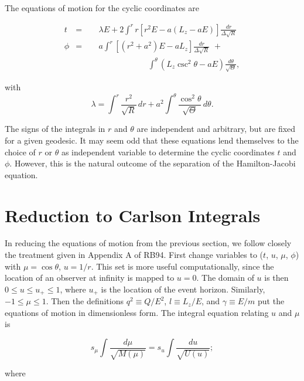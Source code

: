 \documentclass[apj]{emulateapj}
\begin{document}
The equations of motion for the cyclic coordinates are

\begin{eqnarray}
t &=& \lambda E + 2 \int^r r[r^2E-a(L_z - aE)]\frac{dr}{\Delta \sqrt{R}} \\
\nonumber \phi &=& a \int^r[(r^2+a^2)E-aL_z]\frac{dr}{\Delta \sqrt{R}}\hspace{4pt} +\\  &\qquad&\qquad\qquad\qquad\int^\theta (L_z \csc^2 \theta - aE)\frac{d\theta}{\sqrt{\Theta}},
\end{eqnarray}

\noindent with
\begin{equation}\label{leqnr}
\lambda = \int^r \frac{r^2}{\sqrt{R}}\hspace{2pt} dr + a^2 \int^\theta \frac{\cos^2{\theta}}{\sqrt{\Theta}}\hspace{2pt} d\theta.
\end{equation}

The signs of the integrals in $r$ and $\theta$ are independent and arbitrary, but are fixed for a given geodesic. It may seem odd that these equations lend themselves to the choice of $r$ or $\theta$ as independent variable to determine the cyclic coordinates $t$ and $\phi$. However, this is the natural outcome of the separation of the Hamilton-Jacobi equation.

\section{Reduction to Carlson Integrals}
\label{reductions}
In reducing the equations of motion from the previous section, we follow closely the treatment given in Appendix A of RB94. First change variables to ($t$, $u$, $\mu$, $\phi$) with $\mu = \cos{\theta}$, $u = 1/r$. This set is more useful computationally, since the location of an observer at infinity is mapped to $u=0$. The domain of $u$ is then $0 \le u \le u_+ \le 1$, where $u_+$ is the location of the event horizon. Similarly, $-1 \le \mu \le 1$. Then the definitions $q^2 \equiv Q/E^2$, $l \equiv L_z/E$, and $\gamma \equiv E/m$ put the equations of motion in dimensionless form. The integral equation relating $u$ and $\mu$ is

\begin{equation}\label{imuiu}
s_\mu \int \frac{d\mu}{\sqrt{M(\mu)}} = s_u \int \frac{du}{\sqrt{U(u)}};
\end{equation}

\noindent where 
\end{document}
